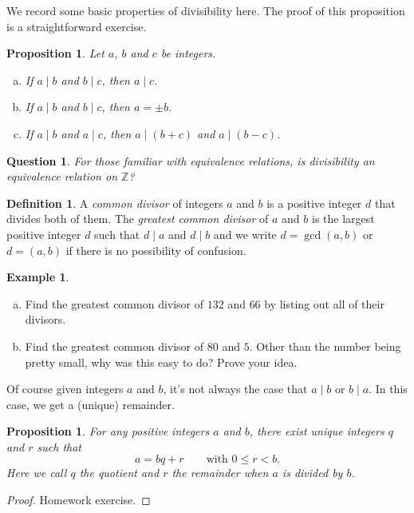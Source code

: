 \documentclass[12pt]{article}
\theoremstyle{plain}
\newtheorem{proposition}[theorem]{Proposition}
\newtheorem{question}[theorem]{Question}
\theoremstyle{definition}
\newtheorem{definition}[theorem]{Definition}
\newtheorem{example}[theorem]{Example}
\theoremstyle{remark}
\newcommand{\Z}{\mathbb{Z}}
\begin{document}
We record some basic properties of divisibility here. The proof of this proposition is a straightforward exercise.

\begin{proposition}
    Let $a$, $b$ and $c$ be integers.
    \begin{enumerate}[(a)]
        \item If $a\mid b$ and $b\mid c$, then $a\mid c$.
        \item If $a\mid b$ and $b\mid c$, then $a = \pm b$.
        \item If $a\mid b$ and $a\mid c$, then $a\mid (b+c)$ and $a\mid (b-c)$.
    \end{enumerate}
\end{proposition}

\begin{question}
    For those familiar with equivalence relations, is divisibility an equivalence relation on $\Z$?
\end{question}

\begin{definition}
    A \emph{common divisor} of integers $a$ and $b$ is a positive integer $d$ that divides both of them.
    The \emph{greatest common divisor} of $a$ and $b$ is the largest positive integer $d$ such that $d\mid a$ and $d\mid b$ and we write $d = \gcd(a,b)$ or $d = (a,b)$ if there is no possibility of confusion.
\end{definition}

\begin{example}
    \begin{enumerate}[(a)]
        \item Find the greatest common divisor of $132$ and $66$ by listing out all of their divisors.

        \item Find the greatest common divisor of $80$ and $5$. Other than the number being pretty small, why was this easy to do? Prove your idea.
    \end{enumerate}
\end{example}

Of course given integers $a$ and $b$, it's not always the case that $a\mid b$ or $b\mid a$.
In this case, we get a (unique) remainder.

\begin{proposition}
    For any positive integers $a$ and $b$, there exist unique integers $q$ and $r$ such that
    \begin{equation}\label{division}
        a = bq + r\qquad \text{with }0\leq r < b.
    \end{equation}
    Here we call $q$ the \emph{quotient} and $r$ the \emph{remainder} when $a$ is divided by $b$.
\end{proposition}
\begin{proof}
    Homework exercise.
\end{proof}
\end{document}
